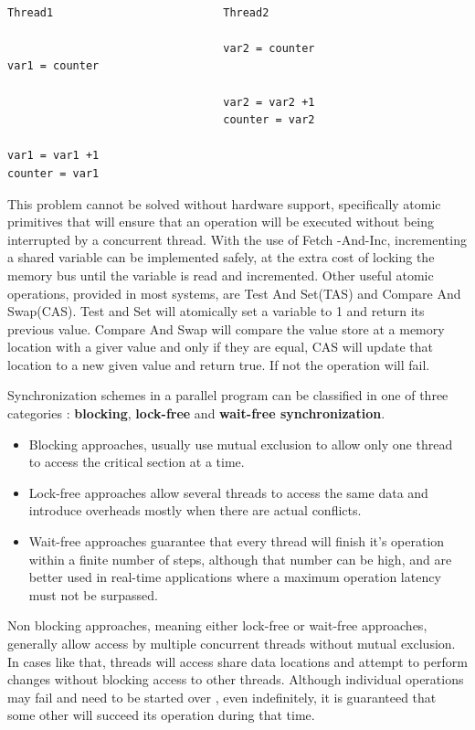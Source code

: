 \begin{lstlisting}[caption={ Inconsistencies caused by the lack of syncronization}]
	
Thread1                          Thread2

                                 var2 = counter
var1 = counter	

                                 var2 = var2 +1
                                 counter = var2

var1 = var1 +1
counter = var1

\end{lstlisting}

This problem cannot be solved without hardware support, specifically atomic primitives that will ensure that an operation will be executed without being interrupted by a concurrent thread.  With the use of Fetch -And-Inc, incrementing a shared variable can be implemented safely, at the extra cost of locking  the memory bus until the variable is read and incremented. Other useful atomic operations, provided in most systems, are Test And Set(TAS) and Compare And Swap(CAS). Test and Set will atomically set a variable to 1 and return its previous value. Compare And Swap will compare the value store at a memory location with a giver value and only if they are equal, CAS will update that location to a new given value and return true. If not the operation will fail.

Synchronization schemes in a parallel program  can be classified in one of three categories : \textbf{blocking}, \textbf{lock-free} and \textbf{wait-free synchronization}.

\begin{itemize}
\item Blocking approaches, usually use mutual exclusion to allow only one thread to access the critical section at a time. 

\item Lock-free approaches allow several threads to access the same data and introduce overheads mostly when there are actual conflicts. 

\item Wait-free approaches guarantee that every thread will finish it's operation within a finite number of steps, although that number can be high, and are better used in real-time applications where a maximum operation latency must not be surpassed. 
\end{itemize}

Non blocking approaches, meaning either lock-free or wait-free approaches, generally allow access by multiple concurrent threads without mutual exclusion. In cases like that, threads will access share data locations and attempt to perform changes without blocking access to other threads. Although individual operations may fail and need to be started over , even indefinitely, it is guaranteed that some other will succeed its operation during that time. %

